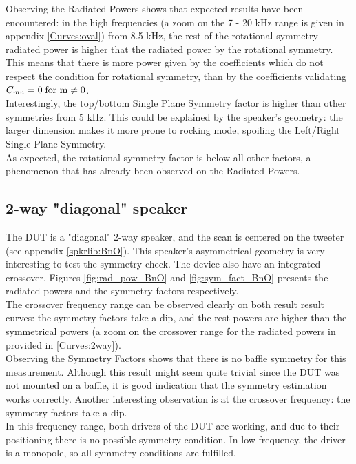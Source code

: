 \documentclass{report}
\begin{document}
Observing the Radiated Powers shows that expected results have been encountered: in the high frequencies (a zoom on the 7 - 20 kHz range is given in appendix \ref{Curves:oval}) from 8.5 kHz, the rest of the rotational symmetry radiated power is higher that the radiated power by the rotational symmetry. This means that there is more power given by the coefficients which do not respect the condition for rotational symmetry, than by the coefficients validating $C_{mn} = 0 \;  \textup{for m}  \neq 0$.  \\

Interestingly, the top/bottom Single Plane Symmetry factor is higher than other symmetries from 5 kHz. This could be explained by the speaker's geometry: the larger dimension makes it more prone to rocking mode, spoiling the Left/Right Single Plane Symmetry. \\
As expected, the rotational symmetry factor is below all other factors, a phenomenon that has already been observed on the Radiated Powers. 



\subsection{2-way "diagonal" speaker}

The DUT is a "diagonal" 2-way speaker, and the scan is centered on the tweeter (see appendix \ref{spkrlib:BnO}). This speaker's asymmetrical geometry is very interesting to test the symmetry check. The device also have an integrated crossover. Figures \ref{fig:rad_pow_BnO} and \ref{fig:sym_fact_BnO} presents the radiated powers and the symmetry factors respectively. \\

The crossover frequency range can be observed clearly on both result result curves: the symmetry factors take a dip, and the rest powers are higher than the symmetrical powers (a zoom on the crossover range for the radiated powers in provided in \ref{Curves:2way}).\\

Observing the Symmetry Factors shows that there is no baffle symmetry for this measurement. Although this result might seem quite trivial since the DUT was not mounted on a baffle, it is good indication that the symmetry estimation works correctly. Another interesting observation is at the crossover frequency: the symmetry factors take a dip. \\
In this frequency range, both drivers of the DUT are working, and due to their positioning there is no possible symmetry condition. In low frequency, the driver is a monopole, so all symmetry conditions are fulfilled.\\
\end{document}
